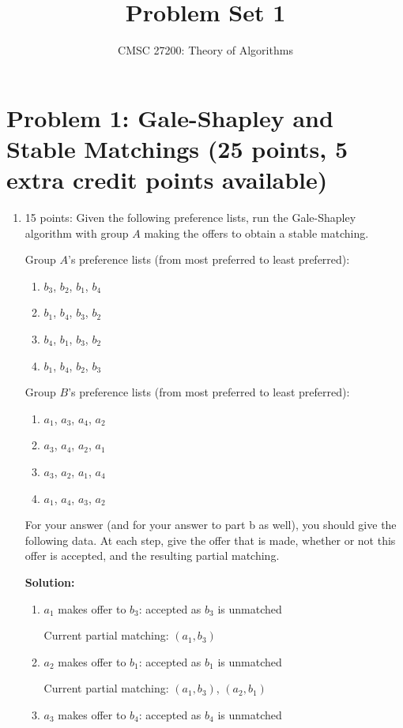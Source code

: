 \documentclass[12pt]{article}
\title{Problem Set 1}
\author{CMSC 27200: Theory of Algorithms}
\date{}
\begin{document}
\maketitle

\section*{Problem 1: Gale-Shapley and Stable Matchings (25 points, 5 extra credit points available)}
\begin{enumerate}
\item[(a)] 15 points: Given the following preference lists, run the Gale-Shapley algorithm with group $A$ making the offers to obtain a stable matching.

Group $A$'s preference lists (from most preferred to least preferred):
\begin{enumerate}
\item[$a_1$:] $b_3$, $b_2$, $b_1$, $b_4$
\item[$a_2$:] $b_1$, $b_4$, $b_3$, $b_2$
\item[$a_3$:] $b_4$, $b_1$, $b_3$, $b_2$
\item[$a_4$:] $b_1$, $b_4$, $b_2$, $b_3$
\end{enumerate}
Group $B$'s preference lists (from most preferred to least preferred):
\begin{enumerate}
\item[$b_1$:] $a_1$, $a_3$, $a_4$, $a_2$
\item[$b_2$:] $a_3$, $a_4$, $a_2$, $a_1$
\item[$b_3$:] $a_3$, $a_2$, $a_1$, $a_4$
\item[$b_4$:] $a_1$, $a_4$, $a_3$, $a_2$
\end{enumerate}
For your answer (and for your answer to part b as well), you should give the following data. At each step, give the offer that is made, whether or not this offer is accepted, and the resulting partial matching.

\textbf{Solution:}
\begin{enumerate}
\item $a_1$ makes offer to $b_3$: accepted as $b_3$ is unmatched

Current partial matching: $(a_1,b_3)$
\item $a_2$ makes offer to $b_1$: accepted as $b_1$ is unmatched

Current partial matching: $(a_1,b_3)$, $(a_2,b_1)$
\item $a_3$ makes offer to $b_4$: accepted as $b_4$ is unmatched


\end{enumerate}
\end{enumerate}
\end{document}
